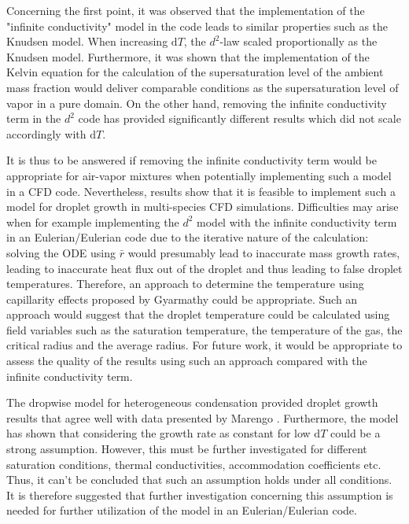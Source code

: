 \documentclass[12pt]{article}
\numberwithin{equation}{section}
\begin{document}
Concerning the first point, it was observed that the implementation of the "infinite conductivity" model in the code leads to similar properties such as the Knudsen model. When increasing $\mathrm{d}T$, the $d^{2}$-law scaled proportionally as the Knudsen model. Furthermore, it was shown that the implementation of the Kelvin equation for the calculation of the supersaturation level of the ambient mass fraction would deliver comparable conditions as the supersaturation level of vapor in a pure domain. On the other hand, removing the infinite conductivity term in the $d^{2}$ code has provided significantly different results which did not scale accordingly with $\mathrm{d}T$. 

It is thus to be answered if removing the infinite conductivity term would be appropriate for air-vapor mixtures when potentially implementing such a model in a CFD code. Nevertheless, results show that it is feasible to implement such a model for droplet growth in multi-species CFD simulations. Difficulties may arise when for example implementing the $d^{2}$ model with the infinite conductivity term in an Eulerian/Eulerian code due to the iterative nature of the calculation: solving the ODE using $\bar{r}$ would presumably lead to inaccurate mass growth rates, leading to inaccurate heat flux out of the droplet and thus leading to false droplet temperatures. Therefore, an approach to determine the temperature using capillarity effects proposed by Gyarmathy \cite{gyarmathy1962grundlagen} could be appropriate. Such an approach would suggest that the droplet temperature could be calculated using field variables such as the saturation temperature, the temperature of the gas, the critical radius and the average radius. For future work, it would be appropriate to assess the quality of the results using such an approach compared with the infinite conductivity term.

The dropwise model for heterogeneous condensation provided droplet growth results that agree well with data presented by Marengo \cite{marengo2022surface}. Furthermore, the model has shown that considering the growth rate as constant for low $\mathrm{d}T$ could be a strong assumption. However, this must be further investigated for different saturation conditions, thermal conductivities, accommodation coefficients etc. Thus, it can't be concluded that such an assumption holds under all conditions. It is therefore suggested that further investigation concerning this assumption is needed for further utilization of the model in an Eulerian/Eulerian code.
\end{document}
